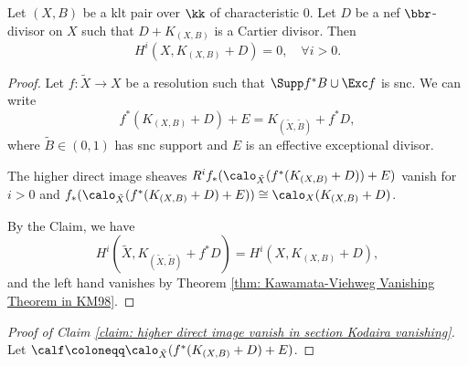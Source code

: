     \begin{theorem}\label{thm: Kodaira Vanishing Theorem for klt pair}
        Let \((X,B)\) be a klt pair over \(\kk\) of characteristic \(0\).
        Let \(D\) be a nef \(\bbr\)-divisor on \(X\) such that \(D + K_{(X,B)}\) is a Cartier divisor.
        Then
        \[ H^i(X, K_{(X,B)} + D) = 0,\quad \forall i > 0. \]
    \end{theorem}
    \begin{proof}
        Let \(f: \tilde{X} \to X\) be a resolution such that \(\Supp f^*B \cup \Exc f\) is snc.
        We can write
        \[ f^*(K_{(X,B)} + D) + E = K_{(\tilde{X},\tilde{B})} + f^*D, \]
        where \(\tilde{B} \in (0,1)\) has snc support and \(E\) is an effective exceptional divisor.

        \begin{claim}\label{claim: higher direct image vanish in section Kodaira vanishing}
            The higher direct image sheaves \(R^if_*(\calo_{\tilde{X}}(f^*(K_{(X,B)} + D)) + E)\) vanish for \(i > 0\) and \(f_*(\calo_{\tilde{X}}(f^*(K_{(X,B)} + D) + E)) \cong \calo_X(K_{(X,B)}+D)\).
        \end{claim}

        By the Claim, we have 
        \[ H^i(\tilde{X}, K_{(\tilde{X},\tilde{B})} + f^*D) = H^i(X, K_{(X,B)}+D), \] 
        and the left hand vanishes by Theorem \ref{thm: Kawamata-Viehweg Vanishing Theorem in KM98}.
    \end{proof}
    \begin{proof}[Proof of Claim \ref{claim: higher direct image vanish in section Kodaira vanishing}]
        Let \(\calf\coloneqq \calo_{\tilde{X}}(f^*(K_{(X,B)} + D) + E)\).
    \end{proof}